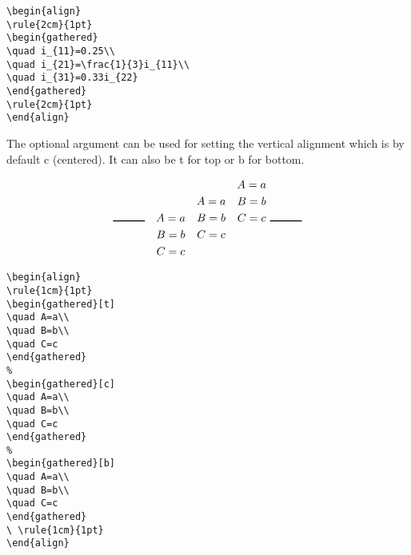 \begin{table}[htb]
%
\begin{lstlisting}
\begin{align}
\rule{2cm}{1pt}
\begin{gathered}
\quad i_{11}=0.25\\
\quad i_{21}=\frac{1}{3}i_{11}\\
\quad i_{31}=0.33i_{22}
\end{gathered}
\rule{2cm}{1pt}
\end{align}
\end{lstlisting}
%

The optional argument can be used for setting the vertical alignment which is
by default c (centered). It can also be t for top or b for bottom.

\begin{align}
\rule{1cm}{1pt}
\begin{gathered}[t]
\quad A=a\\
\quad B=b\\
\quad C=c
\end{gathered}
%
\begin{gathered}[c]
\quad A=a\\
\quad B=b\\
\quad C=c
\end{gathered}
%
\begin{gathered}[b]
\quad A=a\\
\quad B=b\\
\quad C=c
\end{gathered}
\ \rule{1cm}{1pt}
\end{align}

\begin{lstlisting}
\begin{align}
\rule{1cm}{1pt}
\begin{gathered}[t]
\quad A=a\\
\quad B=b\\
\quad C=c
\end{gathered}
%
\begin{gathered}[c]
\quad A=a\\
\quad B=b\\
\quad C=c
\end{gathered}
%
\begin{gathered}[b]
\quad A=a\\
\quad B=b\\
\quad C=c
\end{gathered}
\ \rule{1cm}{1pt}
\end{align}
\end{lstlisting}



\end{table}
